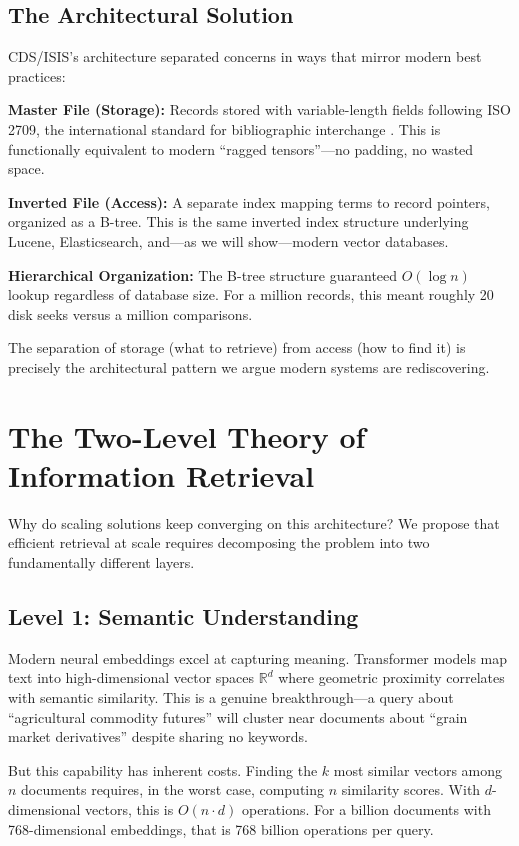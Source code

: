 \documentclass[manuscript,screen,nonacm]{acmart}
\begin{document}
\subsection{The Architectural Solution}

CDS/ISIS's architecture separated concerns in ways that mirror modern best practices:

\textbf{Master File (Storage):} Records stored with variable-length fields following ISO 2709, the international standard for bibliographic interchange \cite{iso2709}. This is functionally equivalent to modern ``ragged tensors''---no padding, no wasted space.

\textbf{Inverted File (Access):} A separate index mapping terms to record pointers, organized as a B-tree. This is the same inverted index structure underlying Lucene, Elasticsearch, and---as we will show---modern vector databases.

\textbf{Hierarchical Organization:} The B-tree structure guaranteed $O(\log n)$ lookup regardless of database size. For a million records, this meant roughly 20 disk seeks versus a million comparisons.

The separation of storage (what to retrieve) from access (how to find it) is precisely the architectural pattern we argue modern systems are rediscovering.

\section{The Two-Level Theory of Information Retrieval}

Why do scaling solutions keep converging on this architecture? We propose that efficient retrieval at scale requires decomposing the problem into two fundamentally different layers.

\subsection{Level 1: Semantic Understanding}

Modern neural embeddings excel at capturing meaning. Transformer models map text into high-dimensional vector spaces $\mathbb{R}^d$ where geometric proximity correlates with semantic similarity. This is a genuine breakthrough---a query about ``agricultural commodity futures'' will cluster near documents about ``grain market derivatives'' despite sharing no keywords.

But this capability has inherent costs. Finding the $k$ most similar vectors among $n$ documents requires, in the worst case, computing $n$ similarity scores. With $d$-dimensional vectors, this is $O(n \cdot d)$ operations. For a billion documents with 768-dimensional embeddings, that is 768 billion operations per query.
\end{document}
